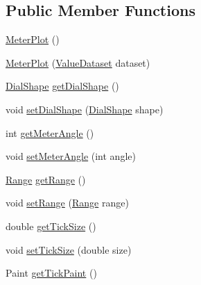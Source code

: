 \subsection*{Public Member Functions}
\begin{DoxyCompactItemize}
\item 
\mbox{\hyperlink{classorg_1_1jfree_1_1chart_1_1plot_1_1_meter_plot_a4a0a29842ec472711756c9a88d8b7947}{Meter\+Plot}} ()
\item 
\mbox{\hyperlink{classorg_1_1jfree_1_1chart_1_1plot_1_1_meter_plot_a2330ceb78207a4218ee69ca939f20b29}{Meter\+Plot}} (\mbox{\hyperlink{interfaceorg_1_1jfree_1_1data_1_1general_1_1_value_dataset}{Value\+Dataset}} dataset)
\item 
\mbox{\hyperlink{classorg_1_1jfree_1_1chart_1_1plot_1_1_dial_shape}{Dial\+Shape}} \mbox{\hyperlink{classorg_1_1jfree_1_1chart_1_1plot_1_1_meter_plot_a0e92b5cd1947bd12216f1695acd5f65e}{get\+Dial\+Shape}} ()
\item 
void \mbox{\hyperlink{classorg_1_1jfree_1_1chart_1_1plot_1_1_meter_plot_af91c31df0845c75304bf53fbe33c4487}{set\+Dial\+Shape}} (\mbox{\hyperlink{classorg_1_1jfree_1_1chart_1_1plot_1_1_dial_shape}{Dial\+Shape}} shape)
\item 
int \mbox{\hyperlink{classorg_1_1jfree_1_1chart_1_1plot_1_1_meter_plot_a6b166a09f3cb56d314a7d0b6c6aa93db}{get\+Meter\+Angle}} ()
\item 
void \mbox{\hyperlink{classorg_1_1jfree_1_1chart_1_1plot_1_1_meter_plot_aef7b760aa154ce1bf12b51bc4d693f91}{set\+Meter\+Angle}} (int angle)
\item 
\mbox{\hyperlink{classorg_1_1jfree_1_1data_1_1_range}{Range}} \mbox{\hyperlink{classorg_1_1jfree_1_1chart_1_1plot_1_1_meter_plot_af69cddd1b820cce44f545b08b3a92af8}{get\+Range}} ()
\item 
void \mbox{\hyperlink{classorg_1_1jfree_1_1chart_1_1plot_1_1_meter_plot_a6f9eba78758e713fcfeeee352d740e2f}{set\+Range}} (\mbox{\hyperlink{classorg_1_1jfree_1_1data_1_1_range}{Range}} range)
\item 
double \mbox{\hyperlink{classorg_1_1jfree_1_1chart_1_1plot_1_1_meter_plot_a14d55a550f52b6faba78c7cfd2d84683}{get\+Tick\+Size}} ()
\item 
void \mbox{\hyperlink{classorg_1_1jfree_1_1chart_1_1plot_1_1_meter_plot_a98f1e32669767d46e910c12afa1236ac}{set\+Tick\+Size}} (double size)
\item 
Paint \mbox{\hyperlink{classorg_1_1jfree_1_1chart_1_1plot_1_1_meter_plot_a3db1e7fc277e356f202e2f4ce5730c12}{get\+Tick\+Paint}} ()
\item 

\end{DoxyCompactItemize}
